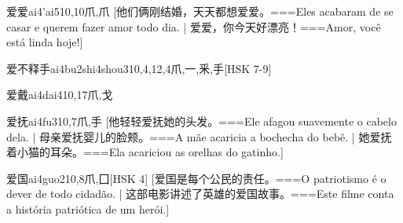 \begin{EntryWithPhonetic}{爱爱}{ai4'ai5}{10,10}{⽖,⽖}
  [他们俩刚结婚，天天都想爱爱。===Eles acabaram de se casar e querem fazer amor todo dia. | 爱爱，你今天好漂亮！===Amor, você está linda hoje!]
\end{EntryWithPhonetic}

\begin{EntryWithPhonetic}{爱不释手}{ai4bu2shi4shou3}{10,4,12,4}{⽖,⼀,⾤,⼿}[HSK 7-9]
\end{EntryWithPhonetic}

\begin{EntryWithPhonetic}{爱戴}{ai4dai4}{10,17}{⽖,⼽}
\end{EntryWithPhonetic}

\begin{EntryWithPhonetic}{爱抚}{ai4fu3}{10,7}{⽖,⼿}
  [他轻轻爱抚她的头发。===Ele afagou suavemente o cabelo dela. | 母亲爱抚婴儿的脸颊。===A mãe acaricia a bochecha do bebê. | 她爱抚着小猫的耳朵。===Ela acariciou as orelhas do gatinho.]
\end{EntryWithPhonetic}

\begin{EntryWithPhonetic}{爱国}{ai4guo2}{10,8}{⽖,⼞}[HSK 4]
  [爱国是每个公民的责任。===O patriotismo é o dever de todo cidadão. | 这部电影讲述了英雄的爱国故事。===Este filme conta a história patriótica de um herói.]
\end{EntryWithPhonetic}

